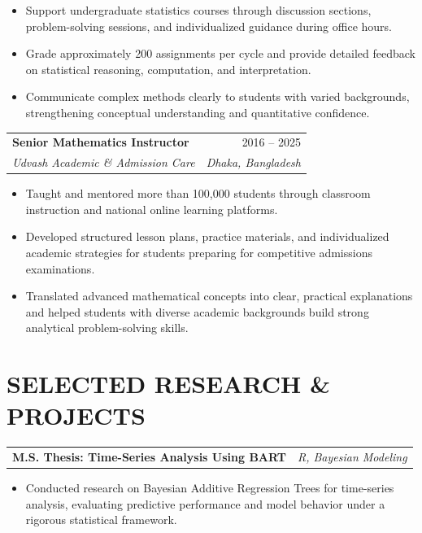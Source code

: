 \documentclass[10pt,letterpaper]{article}
\makeatletter
\newcommand{\resumeEntry}[4]{%
  \begin{tabularx}{\textwidth}{@{}Xr@{}}
    \textbf{#1} & #2 \\
    \textit{#3} & \textit{#4}
  \end{tabularx}%
}
\newcommand{\projectEntry}[2]{%
  \begin{tabularx}{\textwidth}{@{}Xr@{}}
    \textbf{#1} & \textit{#2}
  \end{tabularx}%
}
\newenvironment{resumeItems}{%
  \begin{itemize}[
    label=\textbullet,
    leftmargin=14pt,
    labelsep=5pt,
    itemsep=0.5pt,
    topsep=1.0pt,
    parsep=0pt,
    partopsep=0pt
  ]
}{%
  \end{itemize}
}
\makeatother
\begin{document}
\begin{resumeItems}
  \item Support undergraduate statistics courses through discussion sections, problem-solving sessions, and individualized guidance during office hours.

  \item Grade approximately 200 assignments per cycle and provide detailed feedback on statistical reasoning, computation, and interpretation.

  \item Communicate complex methods clearly to students with varied backgrounds, strengthening conceptual understanding and quantitative confidence.
\end{resumeItems}

\vspace{1.3pt}

\resumeEntry
  {Senior Mathematics Instructor}
  {2016 -- 2025}
  {Udvash Academic \& Admission Care}
  {Dhaka, Bangladesh}

\begin{resumeItems}
  \item Taught and mentored more than 100,000 students through classroom instruction and national online learning platforms.

  \item Developed structured lesson plans, practice materials, and individualized academic strategies for students preparing for competitive admissions examinations.

  \item Translated advanced mathematical concepts into clear, practical explanations and helped students with diverse academic backgrounds build strong analytical problem-solving skills.
\end{resumeItems}

\section*{SELECTED RESEARCH \& PROJECTS}

\projectEntry
  {M.S. Thesis: Time-Series Analysis Using BART}
  {R, Bayesian Modeling}

\begin{resumeItems}
  \item Conducted research on Bayesian Additive Regression Trees for time-series analysis, evaluating predictive performance and model behavior under a rigorous statistical framework.
\end{resumeItems}
\end{document}
